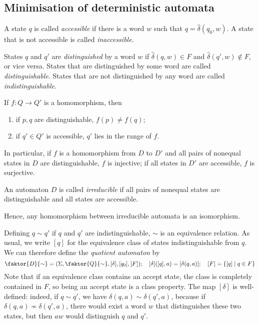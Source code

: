 \subsection{Minimisation of deterministic automata}
\begin{definition}
	A state \( q \) is called \emph{accessible} if there is a word \( w \) such that \( q = \hat \delta(q_0, w) \).
	A state that is not accessible is called \emph{inaccessible}.
\end{definition}
\begin{definition}
	States \( q \) and \( q' \) are \emph{distinguished} by a word \( w \) if \( \hat \delta(q, w) \in F \) and \( \hat \delta(q', w) \not\in F \), or vice versa.
	States that are distinguished by some word are called \emph{distinguishable}.
	States that are not distinguished by any word are called \emph{indistinguishable}.
\end{definition}
If \( f \colon Q \to Q' \) is a homomorphism, then
\begin{enumerate}
	\item if \( p, q \) are distinguishable, \( f(p) \neq f(q) \);
	\item if \( q' \in Q' \) is accessible, \( q' \) lies in the range of \( f \).
\end{enumerate}
In particular, if \( f \) is a homomorphism from \( D \) to \( D' \) and all pairs of nonequal states in \( D \) are distinguishable, \( f \) is injective; if all states in \( D' \) are accessible, \( f \) is surjective.
\begin{definition}
	An automaton \( D \) is called \emph{irreducible} if all pairs of nonequal states are distinguishable and all states are accessible.
\end{definition}
Hence, any homomorphism between irreducible automata is an isomorphism.

Defining \( q \sim q' \) if \( q \) and \( q' \) are indistinguishable, \( \sim \) is an equivalence relation.
As usual, we write \( [q] \) for the equivalence class of states indistinguishable from \( q \).
We can therefore define the \emph{quotient automaton} by
\[ \faktor{D}{\sim} = \qty(\Sigma, \faktor{Q}{\sim}, [\delta], [q_0], [F]);\quad [\delta]([q],a) = [\delta(q,a)];\quad [F] = \qty{[q] \mid q \in F} \]
Note that if an equivalence class contains an accept state, the class is completely contained in \( F \), so being an accept state is a class property.
The map \( [\delta] \) is well-defined: indeed, if \( q \sim q' \), we have \( \delta(q,a) \sim \delta(q',a) \), because if \( \delta(q,a) \not\sim \delta(q',a) \), there would exist a word \( w \) that distinguishes these two states, but then \( aw \) would distinguish \( q \) and \( q' \).

